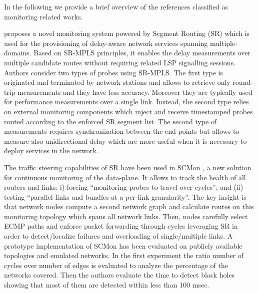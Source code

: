 In the following we provide a brief overview of the references classified as monitoring related works.

\cite{interoperable} proposes a novel monitoring system powered by Segment Routing (SR) which is used for the provisioning of delay-aware network services spanning multiple-domains. Based on SR-MPLS principles, it enables the delay measurements over multiple candidate routes without requiring related LSP signalling sessions. Authors consider two types of probes using SR-MPLS. The first type is originated and terminated by network stations and allows to retrieve only round-trip measurements and they have less accuracy. Moreover they are typically used for performance measurements over a single link. Instead, the second type relies on external monitoring components which inject and receive timestamped probes routed according to the enforced SR segment list. The second type of measurements requires synchronization between the end-points but allows to measure also unidirectional delay which are more useful when it is necessary to deploy services in the network.

The traffic steering capabilities of SR have been used in SCMon \cite{scmon}, a new solution for continuous monitoring of the data-plane. It allows to track the health of all routers and links: i) forcing ``monitoring probes to travel over cycles''; and (ii) testing ``parallel links and bundles at a per-link granularity''. The key insight is that network nodes compute a second network graph and calculate routes on this monitoring topology which spans all network links. Then, nodes carefully select ECMP paths and enforce packet forwarding through cycles leveraging SR in order to detect/localize failures and overloading of single/multiple links. 
A prototype implementation of SCMon has been evaluated on publicly available topologies and emulated networks. In the first experiment the ratio number of cycles over number of edges is evaluated to analyze the percentage of the networks covered. Then the authors evaluate the time to detect black holes showing that most of them are detected within less than 100 msec.

